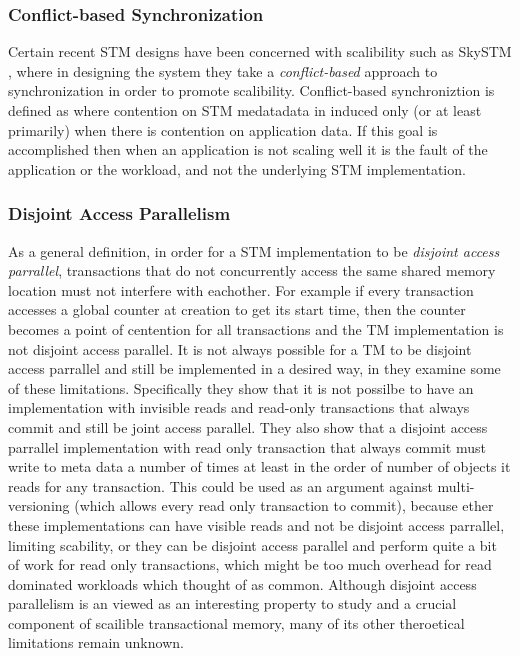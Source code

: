 \subsubsection{Conflict-based Synchronization}
Certain recent STM designs have been concerned with scalibility such as SkySTM \cite{lev:anatomy:transact:2009}, where in designing the system they take a \emph{conflict-based} approach to synchronization in order to promote scalibility.
Conflict-based synchroniztion is defined as where contention on STM medatadata in induced only (or at least primarily) when there is contention on application data.
If this goal is accomplished then when an application is not scaling well it is the fault of the application or the workload, and not the underlying STM implementation.

\subsubsection{Disjoint Access Parallelism}
As a general definition, in order for a STM implementation to be \emph{disjoint access parrallel}, transactions that do not concurrently access the same shared memory location must not interfere with eachother.
For example if every transaction accesses a global counter at creation to get its start time, then the counter becomes a point of centention for all transactions and the TM implementation is not disjoint access parallel.
It is not always possible for a TM to be disjoint access parrallel and still be implemented in a desired way, in \cite{1584015} they examine some of these limitations.
Specifically they show that it is not possilbe to have an implementation with invisible reads and read-only transactions that always commit and still be joint access parallel.
They also show that a disjoint access parrallel implementation with read only transaction that always commit must write to meta data a number of times at least in the order of number of objects it reads for any transaction.
This could be used as an argument against multi-versioning (which allows every read only transaction to commit), because ether these implementations can have visible reads and not be disjoint access parrallel, limiting scability, or they can be disjoint access parallel and perform quite a bit of work for read only transactions, which might be too much overhead for read dominated workloads which thought of as common.
Although disjoint access parallelism is an viewed as an interesting property to study and a crucial component of scailible transactional memory, many of its other theroetical limitations remain unknown.
